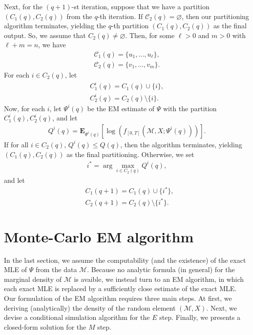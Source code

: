 \documentclass[12pt]{article}%
\begin{document}
Next, for the $(q+1)$-st iteration, suppose that we have a partition $(C_1(q), C_2(q))$ from the $q$-th iteration. If $\mathcal C_2(q) = \varnothing$, then our partitioning algorithm terminates, yielding the $q$-th partition $(C_1(q), C_2(q))$ as the final output.  So, we assume that $C_2(q)\neq \varnothing$.  Then, for some $\ell > 0$ and $m > 0$ with $\ell + m = n$, we have 
\begin{eqnarray}
\mathcal C_1(q) = \{u_1,\ldots, u_\ell\},\\
\mathcal C_2(q) = \{v_1,\ldots, v_m\}.
\end{eqnarray} 
For each $i \in C_2(q)$, let 
\begin{eqnarray}
C_1^{i}(q) = C_1(q) \cup \{i\}, \\
C_2^{i}(q) = C_2(q) \setminus \{i\}.
\end{eqnarray}
Now, for each $i$, let $\Psi^{i}(q)$ be the EM estimate of $\Psi$ with the partition $C_1^{i}(q), C_2^{i}(q)$, and let 
\begin{eqnarray}
Q^{i}(q) = \mathbf E_{\Psi^{i}(q)}\left[\log(f_{[0,T]}(\mathcal M,X;\Psi^{i}(q)))\right].
\end{eqnarray}
If for all $i \in C_2(q)$, $Q^{i}(q) \le Q(q)$, then the algorithm terminates, yielding 
$(C_1(q), C_2(q))$ as the final partitioning.  Otherwise, we set 
\begin{eqnarray}
i^* = \arg\max_{i \in C_2(q)} Q^{i}(q),
\end{eqnarray}
and let 
\begin{eqnarray}
&C_1(q+1) = C_1(q) \cup \{i^*\},\\
&C_2(q+1) = C_2(q) \setminus \{i^*\}.
\end{eqnarray}

\section{Monte-Carlo EM algorithm}
In the last section, we assume the computability (and the existence) 
of the exact MLE of $\Psi$ from the data $\mathcal M$.   
Because no analytic formula (in general) for the marginal density 
of $\mathcal M$ is avaible,
we instead turn to an EM algorithm, in which each exact MLE is replaced 
by a sufficiently close estimate of the exact MLE.
Our formulation of the EM algorithm requires 
three main steps.  
At first, we deriving (analytically) 
the density of the random element $(\mathcal M, X)$.  
Next, we devise a conditional simulation algorithm for the $E$ step.  
Finally, we presents a closed-form solution for the $M$ step.
\end{document}

